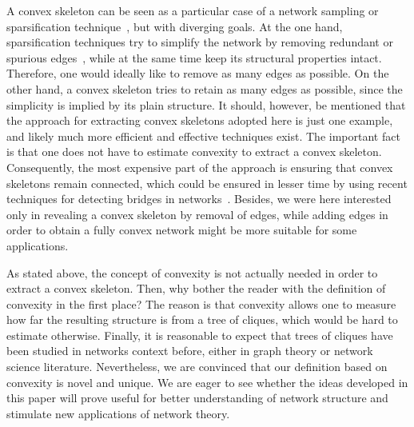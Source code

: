 \documentclass[]{rsif}
\begin{document}
A convex skeleton can be seen as a particular case of a network sampling or sparsification technique~\cite{LF06,HLMSW16,BSB17}, but with diverging goals. At the one hand, sparsification techniques try to simplify the network by removing redundant or spurious edges~\cite{GS09b,CN17}, while at the same time keep its structural properties intact. Therefore, one would ideally like to remove as many edges as possible. On the other hand, a convex skeleton tries to retain as many edges as possible, since the simplicity is implied by its plain structure. It should, however, be mentioned that the approach for extracting convex skeletons adopted here is just one example, and likely much more efficient and effective techniques exist. The important fact is that one does not have to estimate convexity to extract a convex skeleton. Consequently, the most expensive part of the approach is ensuring that convex skeletons remain connected, which could be ensured in lesser time by using recent techniques for detecting bridges in networks~\cite{WTL18}. Besides, we were here interested only in revealing a convex skeleton by removal of edges, while adding edges in order to obtain a fully convex network might be more suitable for some applications.

As stated above, the concept of convexity is not actually needed in order to extract a convex skeleton. Then, why bother the reader with the definition of convexity in the first place? The reason is that convexity allows one to measure how far the resulting structure is from a tree of cliques, which would be hard to estimate otherwise. Finally, it is reasonable to expect that trees of cliques have been studied in networks context before, either in graph theory or network science literature. Nevertheless, we are convinced that our definition based on convexity is novel and unique. We are eager to see whether the ideas developed in this paper will prove useful for better understanding of network structure and stimulate new applications of network theory.

%
%

\vskip1pc

\end{document}
